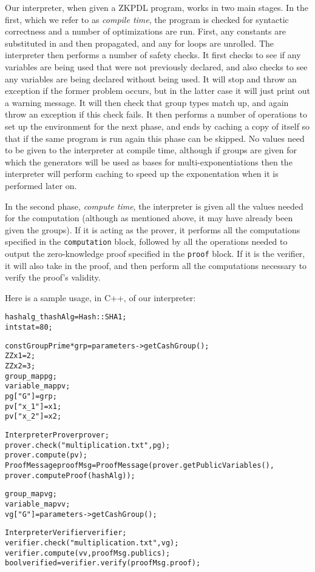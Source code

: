 \documentclass[letterpaper,11pt]{article}
\begin{document}
Our interpreter, when given a ZKPDL program, works in two main stages.  In the
first, which we refer to as \emph{compile time}, the program is checked for 
syntactic correctness and a number of
optimizations are run.  First, any constants are substituted in and then
propagated, and any for loops are unrolled.  The interpreter then performs a
number of safety checks.  It first checks to see if any variables are being
used that were not previously declared, and also checks to see any variables
are being declared without being used.  It will stop and throw an exception 
if the former problem occurs, but in the latter case it will just
print out a warning message.  It will then check that group types match up,
and again throw an exception if this check fails.  It then performs a
number of operations to set up the environment for the next phase, and ends by 
caching a copy of itself so that if the
same program is run again this phase can be skipped.  No values need to be
given to the interpreter at compile time, although if groups are given for
which the generators will be used as bases for
multi-exponentiations then the interpreter will perform caching to
speed up the exponentation when it is performed later on.

In the second phase, \emph{compute time}, the interpreter is given all the
values needed for the computation (although as mentioned above, it may have
already been given the groups).  If it is acting as the prover, it performs 
all the computations
specified in the \verb#computation# block, followed by all the operations
needed to output the zero-knowledge proof specified in the \verb#proof# block.
If it is the verifier, it will also take in the proof, and then perform all
the computations necessary to verify the proof's validity.

Here is a sample usage, in C++, of our interpreter:

\begin{alltt}
\footnotesize{

hashalg_t hashAlg = Hash::SHA1;
int stat = 80;

const GroupPrime* grp = parameters->getCashGroup();
ZZ x1 = 2;
ZZ x2 = 3;
group_map pg;
variable_map pv;
pg["G"] = grp;
pv["x_1"] = x1;
pv["x_2"] = x2;

InterpreterProver prover;
prover.check("multiplication.txt", pg);
prover.compute(pv);
ProofMessage proofMsg = ProofMessage(prover.getPublicVariables(),
					 		 		 prover.computeProof(hashAlg));

group_map vg;
variable_map vv;
vg["G"] = parameters->getCashGroup();

InterpreterVerifier verifier;
verifier.check("multiplication.txt", vg);
verifier.compute(vv, proofMsg.publics);
bool verified = verifier.verify(proofMsg.proof);
}
\end{alltt}


\end{document}
